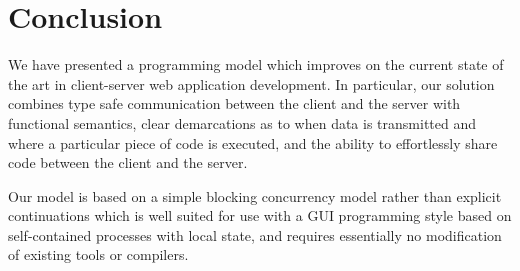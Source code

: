 \documentclass[preprint]{sigplanconf}
\begin{document}
\section{Conclusion}

We have presented a programming model which improves on the current state of
the art in client-server web application development. In particular, our
solution combines type safe communication between the client and the server
with functional semantics, clear demarcations as to when data is transmitted
and where a particular piece of code is executed, and the ability to
effortlessly share code between the client and the server.

Our model is based on a simple blocking concurrency model rather than explicit
continuations which is well suited for use with a GUI programming style based on
self-contained processes with local state, and requires essentially no
modification of existing tools or compilers.

%




\end{document}
